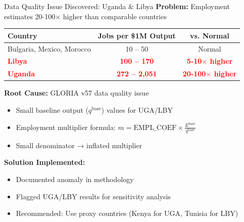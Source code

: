 \documentclass[10pt]{beamer}
\begin{document}

\begin{frame}{Data Quality Issue Discovered: Uganda \& Libya}
\textbf{Problem:} Employment estimates 20-100$\times$ higher than comparable countries

\vspace{0.3cm}

\begin{table}[h]
\centering
\footnotesize
\begin{tabular}{lcc}
\toprule
\textbf{Country} & \textbf{Jobs per \$1M Output} & \textbf{vs. Normal} \\
\midrule
Bulgaria, Mexico, Morocco & 10 -- 50 & Normal \\
\midrule
\textcolor{red}{\textbf{Libya}} & \textcolor{red}{\textbf{100 -- 170}} & \textcolor{red}{\textbf{5-10$\times$ higher}} \\
\textcolor{red}{\textbf{Uganda}} & \textcolor{red}{\textbf{272 -- 2,051}} & \textcolor{red}{\textbf{20-100$\times$ higher}} \\
\bottomrule
\end{tabular}
\end{table}

\vspace{0.3cm}

\textbf{Root Cause:} GLORIA v57 data quality issue
\begin{itemize}
    \item Small baseline output ($q^{\text{base}}$) values for UGA/LBY
    \item Employment multiplier formula: $m = \text{EMPL\_COEF} \times \frac{E^{\text{base}}}{q^{\text{base}}}$
    \item Small denominator → inflated multiplier
\end{itemize}

\vspace{0.3cm}

\textbf{Solution Implemented:}
\begin{itemize}
    \item Documented anomaly in methodology
    \item Flagged UGA/LBY results for sensitivity analysis
    \item Recommended: Use proxy countries (Kenya for UGA, Tunisia for LBY)
\end{itemize}

\end{frame}
\end{document}
